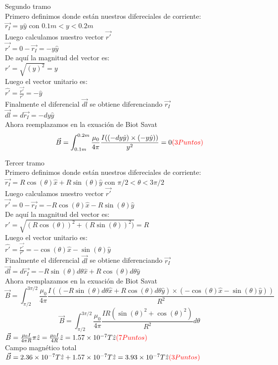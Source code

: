 \documentclass[letterpaper,11pt]{article}
\begin{document}
Segundo tramo\\

Primero definimos donde están nuestros difereciales de corriente:\\
$\vec{r_I}=y\hat{y}$ con $0.1m<y<0.2m$\\
Luego calculamos nuestro vector $\vec{r'}$\\
$\vec{r'}=0-\vec{r_I}=-y\hat{y}$\\
De aquí la magnitud del vector es:\\
$r'=\sqrt{(y)^2}=y$\\
Luego el vector unitario es:\\
$\hat{r'}=\frac{\vec{r'}}{r'}=-\hat{y}$\\
Finalmente el diferencial $\vec{dl}$ se obtiene diferenciando $\vec{r_I}$\\
$\vec{dl}=d\vec{r_I}=-dy\hat{y}$\\
Ahora reemplazamos en la exuación de Biot Savat\\
\begin{equation*}
\vec{B}=\int_{0.1m}^{0.2m} \frac{\mu_0}{4\pi} \frac{I((-dy\hat{y})\times(-y\hat{y}))}{y^2}=0  \textcolor{red}{(3 Puntos)}
\end{equation*}

Tercer tramo\\

Primero definimos donde están nuestros difereciales de corriente:\\
$\vec{r_I}=R\cos(\theta)\hat{x}+R\sin(\theta)\hat{y}$ con $\pi/2<\theta<3\pi/2$\\
Luego calculamos nuestro vector $\vec{r'}$\\
$\vec{r'}=0-\vec{r_I}=-R\cos(\theta)\hat{x}-R\sin(\theta)\hat{y}$\\
De aquí la magnitud del vector es:\\
$r'=\sqrt{(R\cos(\theta))^2+(R\sin(\theta))^2)}=R$\\
Luego el vector unitario es:\\
$\hat{r'}=\frac{\vec{r'}}{r'}=-\cos(\theta)\hat{x}-\sin(\theta)\hat{y}$\\
Finalmente el diferencial $\vec{dl}$ se obtiene diferenciando $\vec{r_I}$\\
$\vec{dl}=d\vec{r_I}=-R\sin(\theta)d\theta\hat{x}+R\cos(\theta)d\theta\hat{y}$\\
Ahora reemplazamos en la exuación de Biot Savat\\
\begin{equation*}
\vec{B}=\int_{\pi/2}^{3\pi/2} \frac{\mu_0}{4\pi} \frac{I((-R\sin(\theta)d\theta\hat{x}+R\cos(\theta)d\theta\hat{y})\times(-\cos(\theta)\hat{x}-\sin(\theta)\hat{y}))}{R^2}
\end{equation*}
\begin{equation*}
\vec{B}=\int_{\pi/2}^{3\pi/2} \frac{\mu_0}{4\pi} \frac{IR(\sin(\theta)^2+\cos(\theta)^2)}{R^2}d\theta
\end{equation*}
$\vec{B}=\frac{\mu_0 I}{4\pi R} \pi\hat{z}=\frac{\mu_0 I}{4R}\hat{z}=1.57\times 10^{-7} T \hat{z} \textcolor{red}{(7 Puntos)}$\\

Campo magnético total\\

$\vec{B}=2.36\times 10^{-7} T \hat{z} + 1.57\times 10^{-7} T \hat{z}=3.93\times 10^{-7} T \hat{z} \textcolor{red}{(3 Puntos)}$
\end{document}
